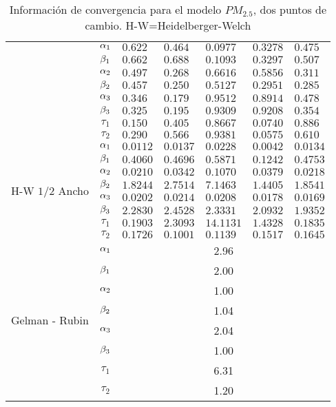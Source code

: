 \begin{table}[!h]
\begin{tabular}{|l|c|l|l|l|l|l|}
& $\alpha_1$ & $0.622$ & $0.464 $ & $ 0.0977$ & $0.3278$  & $0.475   $\\ 
\cline{2-7}
& $\beta_1$& $0.662  $ & $0.688   $ & $0.1093$ & $0.3297$ & $0.507 $\\
\cline{2-7}
& $\alpha_2$& $ 0.497 $ & $0.268$ & $0.6616$ & $ 0.5856$ & $0.311$\\
\cline{2-7}
& $\beta_2$& $0.457 $ & $0.250$ & $0.5127 $ & $0.2951$ & $0.285$\\
\cline{2-7}
& $\alpha_3$& $0.346 $ & $0.179$ & $0.9512$ & $0.8914$ & $0.478 $\\
\cline{2-7}
& $\beta_3$& $ 0.325 $ & $0.195$ & $0.9309$ & $0.9208$ & $0.354$\\
\cline{2-7}
& $\tau_1$& $0.150  $ & $0.405 $ & $0.8667$ & $0.0740$ & $0.886$\\
\cline{2-7}
& $\tau_2$& $0.290 $ & $0.566$ & $0.9381 $ & $0.0575 $ & $0.610  $\\
\cline{1-7}
\multirow{8}{2.5cm}{H-W $1/2$ Ancho} 

& $\alpha_1$ & $0.0112$ & $0.0137 $ & $0.0228$ & $0.0042$  & $ 0.0134$\\ 
\cline{2-7}
& $\beta_1$& $0.4060  $ & $0.4696$ & $0.5871$ & $0.1242$ & $0.4753 $\\
\cline{2-7}
& $\alpha_2$& $0.0210 $ & $0.0342$ & $0.1070 $ & $0.0379$ & $0.0218$\\
\cline{2-7}
& $\beta_2$& $1.8244 $ & $2.7514$ & $7.1463$ & $1.4405$ & $ 1.8541 $\\
\cline{2-7}
& $\alpha_3$& $0.0202 $ & $0.0214$ & $0.0208 $ & $0.0178$ & $0.0169$\\
\cline{2-7}
& $\beta_3$& $2.2830 $ & $2.4528 $ & $2.3331$ & $2.0932$ & $1.9352$\\
\cline{2-7}
& $\tau_1$& $ 0.1903$ & $2.3093$ & $14.1131$ & $1.4328$ & $ 0.1835 $\\
\cline{2-7}
& $\tau_2$& $0.1726 $ & $0.1001 $ & $0.1139 $ & $0.1517$ & $0.1645 $\\
\cline{1-7}
\multirow{8}{2.5cm}{Gelman - Rubin} 

& $\alpha_1$ & \multicolumn{5}{|c|}{2.96}\\ \cline{2-7}
&$\beta_1$ &  \multicolumn{5}{|c|}{2.00} \\ \cline{2-7}
&$\alpha_2$ &  \multicolumn{5}{|c|}{1.00} \\ \cline{2-7}
&$\beta_2$ &  \multicolumn{5}{|c|}{1.04} \\ \cline{2-7}
&$\alpha_3$ &  \multicolumn{5}{|c|}{2.04} \\ \cline{2-7}
&$\beta_3$ &  \multicolumn{5}{|c|}{1.00} \\ \cline{2-7}
&$\tau_1$ &  \multicolumn{5}{|c|}{6.31} \\ \cline{2-7}
&$\tau_2$ &  \multicolumn{5}{|c|}{1.20} \\ \cline{1-7}



\end{tabular}
\caption{Información de convergencia para el modelo $PM_{2.5}$, dos puntos de cambio. H-W=Heidelberger-Welch}
\label{convergencia_dpdc_pm25}
\end{table}




